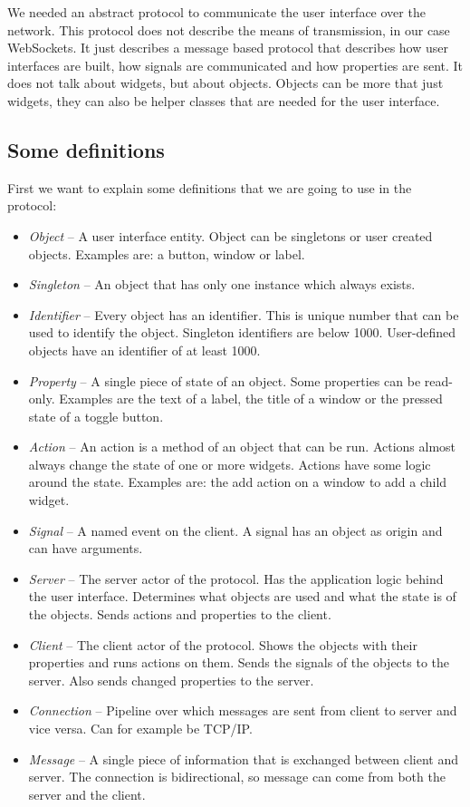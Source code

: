 \documentclass[11pt,a4paper]{article}
\begin{document}
We needed an abstract protocol to communicate the user interface over the network.
This protocol does not describe the means of transmission, in our case WebSockets.
It just describes a message based protocol that describes how user interfaces are built, how signals are communicated and how properties are sent.
It does not talk about widgets, but about objects. Objects can be more that just widgets, they can also be helper classes that are needed for the user interface.

\subsection{Some definitions}

First we want to explain some definitions that we are going to use in the protocol:

\begin{itemize}
\item \textit{Object} -- A user interface entity. Object can be singletons or user created objects. Examples are: a button, window or label.
\item \textit{Singleton} -- An object that has only one instance which always exists.
\item \textit{Identifier} -- Every object has an identifier.
This is unique number that can be used to identify the object.
Singleton identifiers are below 1000.
User-defined objects have an identifier of at least 1000.
\item \textit{Property} -- A single piece of state of an object. Some properties can be read-only.
Examples are the text of a label, the title of a window or the pressed state of a toggle button.
\item \textit{Action} -- An action is a method of an object that can be run.
Actions almost always change the state of one or more widgets.
Actions have some logic around the state.
Examples are: the add action on a window to add a child widget.
\item \textit{Signal} -- A named event on the client.
A signal has an object as origin and can have arguments.
\item \textit{Server} -- The server actor of the protocol.
Has the application logic behind the user interface.
Determines what objects are used and what the state is of the objects.
Sends actions and properties to the client.
\item \textit{Client} -- The client actor of the protocol.
Shows the objects with their properties and runs actions on them.
Sends the signals of the objects to the server.
Also sends changed properties to the server.
\item \textit{Connection} -- Pipeline over which messages are sent from client to server and vice versa.
Can for example be TCP/IP.
\item \textit{Message} -- A single piece of information that is exchanged between client and server.
The connection is bidirectional, so message can come from both the server and the client.
\end{itemize}
\end{document}
